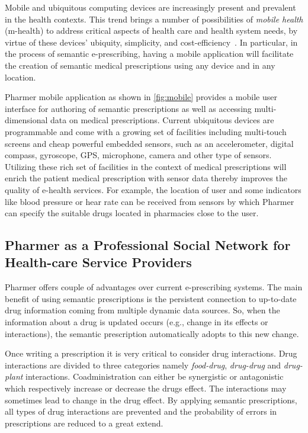 \documentclass[journal]{IEEEtran}
\begin{document}
Mobile and ubiquitous computing devices are increasingly present and prevalent in the health contexts.
This trend brings a number of possibilities of \emph{mobile health} (m-health) to address critical aspects of health care and health system needs, by virtue of these devices’ ubiquity, simplicity, and cost-efficiency~\cite{mHealth}.
In particular, in the process of semantic e-prescribing, having a mobile application will facilitate the creation of semantic medical prescriptions using any device and in any location.

Pharmer mobile application as shown in \autoref{fig:mobile} provides a mobile user interface for authoring of semantic prescriptions as well as accessing multi-dimensional data on medical prescriptions.
Current ubiquitous devices are programmable and come with a growing set of facilities including multi-touch screens and cheap powerful embedded sensors, such as an accelerometer, digital compass, gyroscope, GPS, microphone, camera and other type of sensors.
Utilizing these rich set of facilities in the context of medical prescriptions will enrich the patient medical prescription with sensor data thereby improves the quality of e-health services.
For example, the location of user and some indicators like blood pressure or hear rate can be received from sensors by which Pharmer can specify the suitable drugs located in pharmacies close to the user.

\subsection{Pharmer as a Professional Social Network for Health-care Service Providers}
\label{sec:Pharmernet}
Pharmer offers couple of advantages over current e-prescribing systems.
The main benefit of using semantic prescriptions is the persistent connection to up-to-date drug information coming from multiple dynamic data sources.
So, when the information about a drug is updated occurs (e.g., change in its effects or interactions), the semantic prescription automatically adopts to this new change.

Once writing a prescription it is very critical to consider drug interactions.
Drug interactions are divided to three categories namely \emph{food-drug}, \emph{drug-drug} and \emph{drug-plant} interactions.
Coadministration can either be synergistic or antagonistic which respectively increase or decrease the drugs effect.
The interactions may sometimes lead to change in the drug effect.
By applying semantic prescriptions, all types of drug interactions are prevented and the probability of errors in prescriptions are reduced to a great extend.
\end{document}
